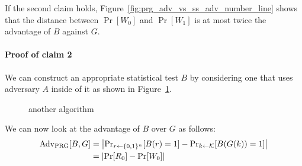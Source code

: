 \documentclass[10pt,a4paper]{report}
\begin{document}
If the second claim holds, Figure~\ref{fig:prg_adv_vs_ss_adv_number_line} shows that the distance
between $\operatorname{Pr}[W_0]$ and $\operatorname{Pr}[W_1]$ is at most twice the advantage of $B$
against $G$.

\paragraph{Proof of claim 2} We can construct an appropriate statistical test $B$ by considering
one that uses adversary $A$ inside of it as shown in Figure~\ref{fig:claim_2_proof}.

\begin{figure}[H]
    \centering
    \caption{another algorithm}
    \label{fig:claim_2_proof}
\end{figure}

We can now look at the advantage of $B$ over $G$ as follows:
\begin{equation*}
\begin{aligned}
    \operatorname{Adv}_{\text{PRG}}[B, G]
        &= \abs{\operatorname{Pr}_{r \leftarrow \{0, 1\}^n}[B(r) = 1] -
                \operatorname{Pr}_{k \leftarrow \mathcal{K}}[B(G(k)) = 1]}\\
        &= \abs{\operatorname{Pr}[R_0] - \operatorname{Pr}[W_0]}
\end{aligned}
\end{equation*}
\end{document}
